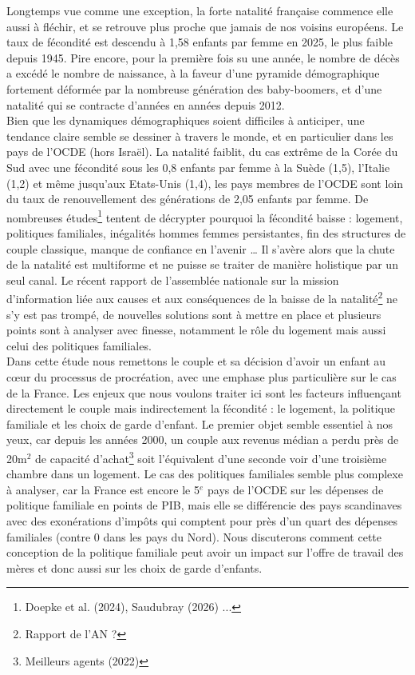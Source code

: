\documentclass[12pt,a4paper]{article}
\begin{document}
Longtemps vue comme une exception, la forte natalité française commence elle aussi à fléchir, et se retrouve plus proche que jamais de nos voisins européens. Le taux de fécondité est descendu à 1,58 enfants par femme en 2025, le plus faible depuis 1945. Pire encore, pour la première fois su une année, le nombre de décès a excédé le nombre de naissance, à la faveur d’une pyramide démographique fortement déformée par la nombreuse génération des baby-boomers, et d’une natalité qui se contracte d’années en années depuis 2012. \\

\noindent Bien que les dynamiques démographiques soient difficiles à anticiper, une tendance claire semble se dessiner à travers le monde, et en particulier dans les pays de l’OCDE (hors Israël). La natalité faiblit, du cas extrême de la Corée du Sud avec une fécondité sous les 0,8 enfants par femme à la Suède (1,5), l’Italie (1,2) et même jusqu’aux Etats-Unis (1,4), les pays membres de l’OCDE sont loin du taux de renouvellement des générations de 2,05 enfants par femme. De nombreuses études\footnote{Doepke et al. (2024), Saudubray (2026) ...} tentent de décrypter pourquoi la fécondité baisse : logement, politiques familiales, inégalités hommes femmes persistantes, fin des structures de couple classique, manque de confiance en l’avenir … Il s’avère alors que la chute de la natalité est multiforme et ne puisse se traiter de manière holistique par un seul canal. Le récent rapport de l’assemblée nationale sur la mission d’information liée aux causes et aux conséquences de la baisse de la natalité\footnote{Rapport de l'AN ?} ne s’y est pas trompé, de nouvelles solutions sont à mettre en place et plusieurs points sont à analyser avec finesse, notamment le rôle du logement mais aussi celui des politiques familiales. \\

\noindent Dans cette étude nous remettons le couple et sa décision d’avoir un enfant au cœur du processus de procréation, avec une emphase plus particulière sur le cas de la France. Les enjeux que nous voulons traiter ici sont les facteurs influençant directement le couple mais indirectement la fécondité : le logement, la politique familiale et les choix de garde d’enfant. Le premier objet semble essentiel à nos yeux, car depuis les années 2000, un couple aux revenus médian a perdu près de 20m$^2$ de capacité d’achat\footnote{Meilleurs agents (2022)}  soit l’équivalent d’une seconde voir d’une troisième chambre dans un logement. Le cas des politiques familiales semble plus complexe à analyser, car la France est encore le 5$^e$ pays de l’OCDE sur les dépenses de politique familiale en points de PIB, mais elle se différencie des pays scandinaves avec des exonérations d’impôts qui comptent pour près d’un quart des dépenses familiales (contre 0 dans les pays du Nord). Nous discuterons comment cette conception de la politique familiale peut avoir un impact sur l’offre de travail des mères et donc aussi sur les choix de garde d’enfants. \\
\end{document}

